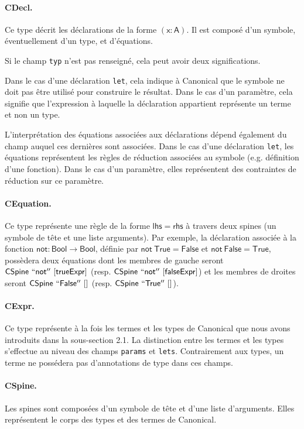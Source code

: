 \documentclass[11pt]{article}
\begin{document}
\paragraph{CDecl.}
Ce type décrit les déclarations de la forme $\mathsf{(x : A)}$.
Il est composé d'un symbole, éventuellement d'un type, et d'équations.

Si le champ \texttt{typ} n'est pas renseigné, cela peut avoir deux significations.

Dans le cas d'une déclaration \texttt{let}, cela indique à Canonical que le symbole ne doit pas être utilisé pour construire le résultat.
Dans le cas d'un paramètre, cela signifie que l'expression à laquelle la déclaration appartient représente un terme et non un type.

L'interprétation des équations associées aux déclarations dépend également du champ auquel ces dernières sont associées.
Dans le cas d'une déclaration \texttt{let}, les équations représentent les règles de réduction associées au symbole (e.g. définition d'une fonction).
Dans le cas d'un paramètre, elles représentent des contraintes de réduction sur ce paramètre.

\paragraph{CEquation.}
Ce type représente une règle de la forme $\mathsf{lhs = rhs}$ à travers deux spines (un symbole de tête et une liste arguments).
Par exemple, la déclaration associée à la fonction $\mathsf{not : Bool \to Bool}$, définie par $\mathsf{not~True = False}$ et $\mathsf{not~False = True}$,
possèdera deux équations dont les membres de gauche seront $\mathsf{CSpine~``not''~[trueExpr]}$ (resp. $\mathsf{CSpine~``not''~[falseExpr]}$) 
et les membres de droites seront $\mathsf{CSpine~``False''~[]}$ (resp. $\mathsf{CSpine~``True''~[]}$). 


\paragraph{CExpr.}
Ce type représente à la fois les termes et les types de Canonical que nous avons introduits dans la sous-section 2.1.
La distinction entre les termes et les types s'effectue au niveau des champs \texttt{params} et \texttt{lets}.
Contrairement aux types, un terme ne possédera pas d'annotations de type dans ces champs.

\paragraph{CSpine.}
Les spines sont composées d'un symbole de tête et d'une liste d'arguments.
Elles représentent le corps des types et des termes de Canonical.
\end{document}
